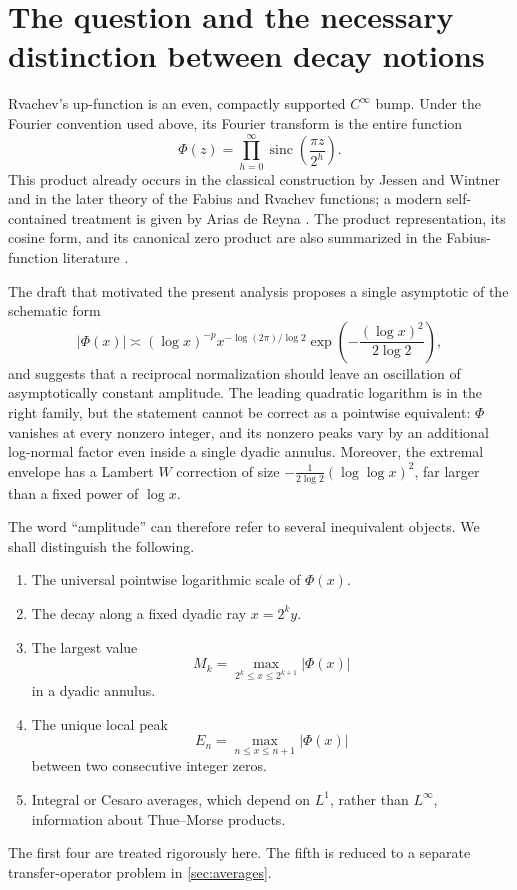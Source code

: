 \documentclass[11pt,oneside]{article}
\theoremstyle{definition}
\theoremstyle{remark}
\newcommand{\sinc}{\operatorname{sinc}}
\newcommand{\PhiF}{\Phi}
\begin{document}
\tableofcontents
\newpage

\section{The question and the necessary distinction between decay notions}
\label{sec:introduction}

Rvachev's up-function is an even, compactly supported \(C^\infty\) bump.
Under the Fourier convention used above, its Fourier transform is the entire
function
\begin{equation}
 \PhiF(z)=\prod_{h=0}^{\infty}
 \sinc\!\left(\frac{\pi z}{2^h}\right).
 \label{eq:Phi-definition}
\end{equation}
This product already occurs in the classical construction by Jessen and
Wintner and in the later theory of the Fabius and Rvachev functions; a modern
self-contained treatment is given by Arias de Reyna \cite{arias2017}.  The
product representation, its cosine form, and its canonical zero product are
also summarized in the Fabius-function literature \cite{wikipediaFabius}.

The draft that motivated the present analysis \cite{proveitDraft} proposes a
single asymptotic of the schematic form
\[
 |\PhiF(x)|\asymp
 (\log x)^{-p}x^{-\log(2\pi)/\log 2}
 \exp\!\left(-\frac{(\log x)^2}{2\log2}\right),
\]
and suggests that a reciprocal normalization should leave an oscillation of
asymptotically constant amplitude.  The leading quadratic logarithm is in the
right family, but the statement cannot be correct as a pointwise equivalent:
\(\PhiF\) vanishes at every nonzero integer, and its nonzero peaks vary by an
additional log-normal factor even inside a single dyadic annulus.  Moreover,
the extremal envelope has a Lambert \(W\) correction of size
\(-\tfrac1{2\log2}(\log\log x)^2\), far larger than a fixed power of
\(\log x\).

The word ``amplitude'' can therefore refer to several inequivalent objects.
We shall distinguish the following.
\begin{enumerate}
 \item The universal pointwise logarithmic scale of \(\PhiF(x)\).
 \item The decay along a fixed dyadic ray \(x=2^k y\).
 \item The largest value
 \[
   M_k=\max_{2^k\le x\le 2^{k+1}}|\PhiF(x)|
 \]
 in a dyadic annulus.
 \item The unique local peak
 \[
   E_n=\max_{n\le x\le n+1}|\PhiF(x)|
 \]
 between two consecutive integer zeros.
 \item Integral or Cesaro averages, which depend on \(L^1\), rather than
 \(L^\infty\), information about Thue--Morse products.
\end{enumerate}
The first four are treated rigorously here.  The fifth is reduced to a
separate transfer-operator problem in \cref{sec:averages}.
\end{document}
